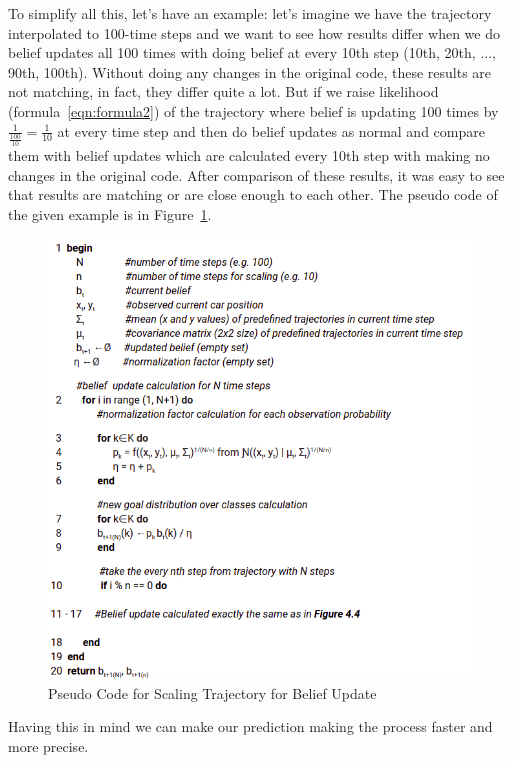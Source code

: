 To simplify all this, let's have an example: let's imagine we have the trajectory interpolated to 100-time steps and we want to see how results differ when we do belief updates all 100 times with doing belief at every 10th step (10th, 20th, ..., 90th, 100th). Without doing any changes in the original code, these results are not matching, in fact, they differ quite a lot. But if we raise likelihood (formula~\ref{eqn:formula2}) of the trajectory where belief is updating 100 times by $\frac{1}{\frac{100}{10}} = \frac{1}{10}$ at every time step and then do belief updates as normal and compare them with belief updates which are calculated every 10th step with making no changes in the original code. After comparison of these results, it was easy to see that results are matching or are close enough to each other. The pseudo code of the given example is in Figure~\ref{fig:PseudoScalling}.

\begin{figure}[h]
	\centering  	
	\includegraphics[width=13cm]{img/Pseudo4Scalling.jpg}
	\caption{Pseudo Code for Scaling Trajectory for Belief Update}
	\label{fig:PseudoScalling}    
\end{figure}

Having this in mind we can make our prediction making the process faster and more precise. 

